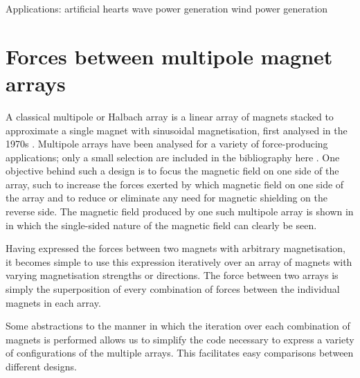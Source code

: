 \documentclass[11pt,a4paper]{memoir}
\begin{document}
Applications:
artificial hearts \parencite{finocchiaro2008,samiappan2008}
wave power generation \parencite{kimoulakis2008}
wind power generation \parencite{liu2008-ietm}



\section{Forces between multipole magnet arrays}

A classical multipole or Halbach array is a linear array of magnets stacked to approximate a single magnet with sinusoidal magnetisation, first analysed in the 1970s \parencite{halbach1981,shute2000-ietm}. Multipole arrays have been analysed for a variety of force-producing applications; only a small selection are included in the bibliography here \parencite{lee2004-mx,robertson2005-ietm,rovers2009-ietm}. One objective behind such a design is to focus the magnetic field on one side of the array, such to increase the forces exerted by which magnetic field on one side of the array and to reduce or eliminate any need for magnetic shielding on the reverse side. The magnetic field produced by one such multipole array is shown in  in which the single-sided nature of the magnetic field can clearly be seen.

Having expressed the forces between two magnets with arbitrary magnetisation, it becomes simple to use this expression iteratively over an array of magnets with varying magnetisation strengths or directions. The force between two arrays is simply the superposition of every combination of forces between the individual magnets in each array.

Some abstractions to the manner in which the iteration over each combination of magnets is performed allows us to simplify the code necessary to express a variety of configurations of the multiple arrays. This facilitates easy comparisons between different designs.
\end{document}

